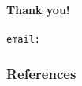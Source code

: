\documentclass[
  ignorenonframetext,
]{beamer}
\makeatletter
\def\@email{}
\makeatother
\begin{document}
\begin{frame}
    \begin{center}
        {\Huge{\textbf{\textcolor[rgb]{0.00,0.00,1.00}{Thank you!}}}}\\
        \vspace{1cm}
        \insertauthor\\
                                    \texttt{email:\@email}
                        \end{center}
\end{frame}
    \begin{frame}[allowframebreaks]
        \frametitle{References}
            {
            }
    \end{frame}
\end{document}
